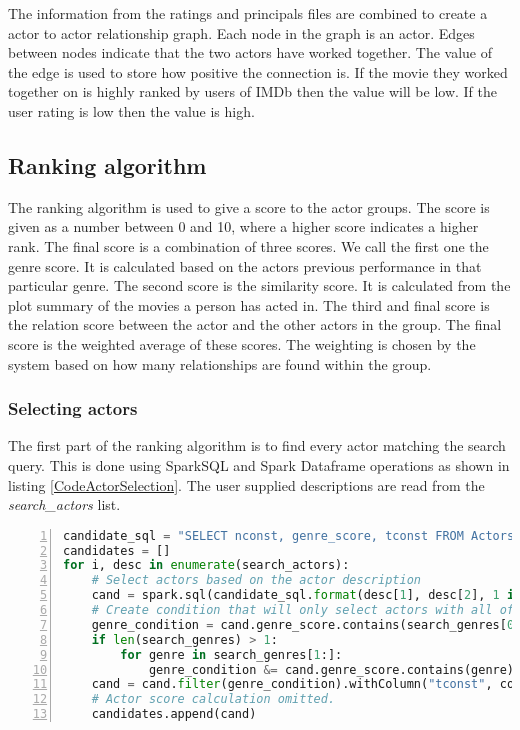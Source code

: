 The information from the ratings and principals files are combined to create a actor to actor relationship graph. Each node in the graph is an actor. Edges between nodes indicate that the two actors have worked together. The value of the edge is used to store how positive the connection is. If the movie they worked together on is highly ranked by users of IMDb then the value will be low. If the user rating is low then the value is high. 



\subsection{Ranking algorithm}

The ranking algorithm is used to give a score to the actor groups. The score is given as a number between 0 and 10, where a higher score indicates a higher rank. The final score is a combination of three scores. We call the first one the genre score. It is calculated based on the actors previous performance in that particular genre. The second score is the similarity score. It is calculated from the plot summary of the movies a person has acted in. The third and final score is the relation score between the actor and the other actors in the group. The final score is the weighted average of these scores. The weighting is chosen by the system based on how many relationships are found within the group.

\subsubsection{Selecting actors}

The first part of the ranking algorithm is to find every actor matching the search query. This is done using SparkSQL and Spark Dataframe operations as shown in listing \ref{CodeActorSelection}. The user supplied descriptions are read from the \textit{search\_actors} list.

\begin{lstlisting}[float=h!, language=Python, caption=Actor selection in PySpark implementation, label=CodeActorSelection, numbers=left]
candidate_sql = "SELECT nconst, genre_score, tconst FROM Actors WHERE age >= {0} AND age <= {1} AND gender= {2}"
candidates = []
for i, desc in enumerate(search_actors):
    # Select actors based on the actor description
    cand = spark.sql(candidate_sql.format(desc[1], desc[2], 1 if desc[0] == "Female" else 0))
    # Create condition that will only select actors with all of the genres.
    genre_condition = cand.genre_score.contains(search_genres[0])
    if len(search_genres) > 1:
        for genre in search_genres[1:]:
            genre_condition &= cand.genre_score.contains(genre)
    cand = cand.filter(genre_condition).withColumn("tconst", convert_to_arr(cand.tconst))
    # Actor score calculation omitted.
    candidates.append(cand)
\end{lstlisting}

